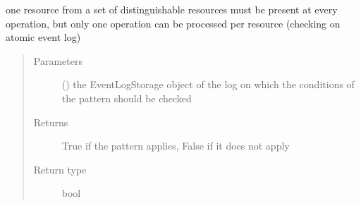 \documentclass[letterpaper,10pt,english]{sphinxmanual}
\begin{document}
\begin{fulllineitems}

\begin{fulllineitems}
\label{\detokenize{event_log_analyzer:event_log_analyzer.pattern_library.manufacturing_scheduling_patterns.DistinguishableResource.pattern_applies}}
\sphinxAtStartPar
one resource from a set of distinguishable resources must be present at every operation, but only one operation can be processed per resource
(checking on atomic event log)
\begin{quote}\begin{description}
\item[{Parameters}] \leavevmode
\sphinxAtStartPar
{} ({\hyperref[\detokenize{event_log_analyzer:event_log_analyzer.event_log.EventLogStorage}]{}}) \textendash{} the EventLogStorage object of the log on which the conditions of the pattern should be checked

\item[{Returns}] \leavevmode
\sphinxAtStartPar
True if the pattern applies, False if it does not apply

\item[{Return type}] \leavevmode
\sphinxAtStartPar
bool

\end{description}\end{quote}

\end{fulllineitems}


\end{fulllineitems}

\end{document}
